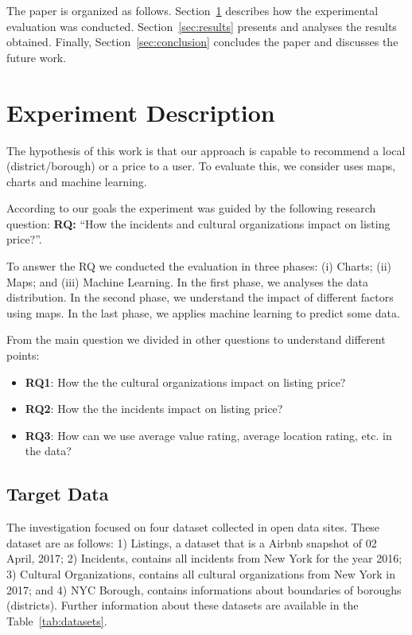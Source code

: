 \documentclass[sigconf]{acmart}
\begin{document}
The paper is organized as follows. Section~\ref{sec:experiment_description} describes how the experimental evaluation was conducted. Section~\ref{sec:results} presents and analyses the results obtained. Finally, Section~\ref{sec:conclusion} concludes the paper and discusses the future work.

\vspace{-0.2cm}
\section{Experiment Description}
\label{sec:experiment_description}

The hypothesis of this work is that our approach is capable to recommend a local (district/borough) or a price to a user. To evaluate this, we consider uses maps, charts and machine learning.

According to our goals the experiment was guided by the following research question: \textbf{RQ:} ``How the incidents and cultural organizations impact on listing price?''.

To answer the RQ we conducted the evaluation in three phases: (i) Charts; (ii) Maps; and (iii) Machine Learning. In the first phase, we analyses the data distribution. In the second phase, we understand the impact of different factors using maps. In the last phase, we applies machine learning to predict some data.
	
From the main question we divided in other questions to understand different points:

\begin{itemize}
	\item \textbf{RQ1}: How the the cultural organizations impact on listing price?
	\item \textbf{RQ2}: How the the incidents impact on listing price?
	\item \textbf{RQ3}: How can we use average value rating, average location rating, etc. in the data?	
\end{itemize}

\vspace{-0.2cm}
\subsection{Target Data}
\label{sec:experiment_description:target_data}

The investigation focused on four dataset collected in open data sites. These dataset are as follows: 1) Listings, a dataset that is a Airbnb snapshot of 02 April, 2017; 2) Incidents, contains all incidents from New York for the year 2016; 3) Cultural Organizations, contains all cultural organizations from New York in 2017; and 4) NYC Borough, contains informations about boundaries of boroughs (districts). Further information about these datasets are available in the Table~\ref{tab:datasets}.
\end{document}
